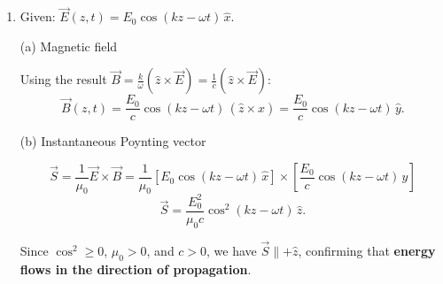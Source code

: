\documentclass[12pt]{article}
\newcommand{\tvec}[1]{\mathbf{#1}}
\newcommand{\tsc}[1]{\mathrm{#1}}
\begin{document}
\begin{enumerate}
\textbf{Compact vector form.} Compute the cross product $\hat{z}\times\tvec{E}_0$ using $(E_0)_z=0$:
\[
\hat{z}\times\tvec{E}_0
= (\tsc{E}_0)_x\,(\hat{z}\times\hat{x})
+ (\tsc{E}_0)_y\,(\hat{z}\times\hat{y})
= (\tsc{E}_0)_x\,\hat{y} - (\tsc{E}_0)_y\,\hat{x}.
\]

Multiplying by $k/\omega$:
\[
\frac{k}{\omega}\left(\hat{z}\times\tvec{E}_0\right)
= -\frac{k}{\omega}(\tsc{E}_0)_y\,\hat{x}
+ \frac{k}{\omega}(\tsc{E}_0)_x\,\hat{y}.
\]

This reproduces exactly the two component relations above, and the $z$-component is automatically zero. Combined with $(E_0)_z=(B_0)_z=0$, all four conditions are captured by the single equation:
\[
\boxed{\tvec{B}_0 = \frac{k}{\omega}\left(\hat{z}\times\tvec{E}_0\right).}
\]

\textbf{Physical interpretation.} In vacuum:
\begin{itemize}
    \item $\vec{E}$ and $\vec{B}$ are both \textbf{transverse} (perpendicular to the propagation direction $\hat{z}$).
    \item $\vec{E}$ and $\vec{B}$ are \textbf{mutually perpendicular} (the cross product $\hat{z}\times\vec{E}$ rotates $\vec{E}$ by $90^\circ$ in the transverse plane).
    \item Their amplitudes are related by $B_0 = E_0/c$, since $\omega/k = c$ in vacuum.
    \item They oscillate \textbf{in phase}.
\end{itemize}


\item Given: $\vec{E}(z,t)=E_0\cos(kz-\omega t)\,\hat{x}$.

(a) Magnetic field

Using the result $\vec{B} = \frac{k}{\omega}(\hat{z}\times\vec{E}) = \frac{1}{c}(\hat{z}\times\vec{E})$:
\[
\vec{B}(z,t)
= \frac{E_0}{c}\cos(kz-\omega t)\,(\hat{z}\times\hat{x})
= \boxed{\frac{E_0}{c}\cos(kz-\omega t)\,\hat{y}.}
\]

(b) Instantaneous Poynting vector

\[
\vec{S} = \frac{1}{\mu_0}\vec{E}\times\vec{B}
= \frac{1}{\mu_0}\left[E_0\cos(kz-\omega t)\,\hat{x}\right]
\times\left[\frac{E_0}{c}\cos(kz-\omega t)\,\hat{y}\right]
\]
\[
\boxed{\vec{S} = \frac{E_0^2}{\mu_0 c}\cos^2(kz-\omega t)\,\hat{z}.}
\]

Since $\cos^2 \geq 0$, $\mu_0 > 0$, and $c > 0$, we have $\vec{S}\parallel +\hat{z}$, confirming that \textbf{energy flows in the direction of propagation}.


\end{enumerate}
\end{document}
